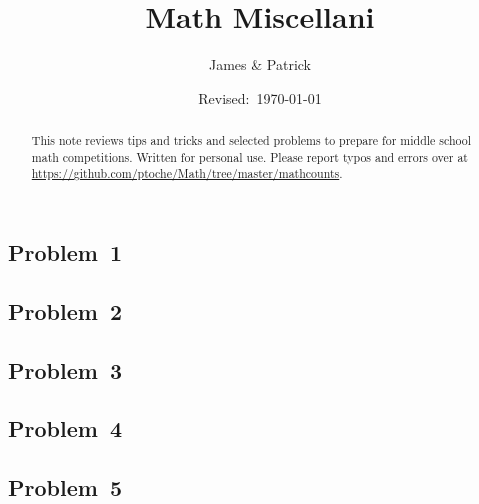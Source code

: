 \documentclass[12pt]{article}
\title{Math Miscellani}
\author{James \& Patrick}
\date{Revised:~\today}
\begin{document}
\maketitle
\begin{abstract}\setlength{\parindent}{0pt}%
This note reviews tips and tricks and selected problems to prepare for middle school math competitions. Written for personal use. Please report typos and errors over at \url{https://github.com/ptoche/Math/tree/master/mathcounts}. 
\end{abstract}

\thispagestyle{empty}
\clearpage

\subsection*{Problem~1}

\begin{solution}
  
\end{solution}

\subsection*{Problem~2}

\begin{solution}
  
\end{solution}

\subsection*{Problem~3}

\begin{solution}
  
\end{solution}

\subsection*{Problem~4}

\begin{solution}
  
\end{solution}

\subsection*{Problem~5}

\begin{solution}
  
\end{solution}
\end{document}
